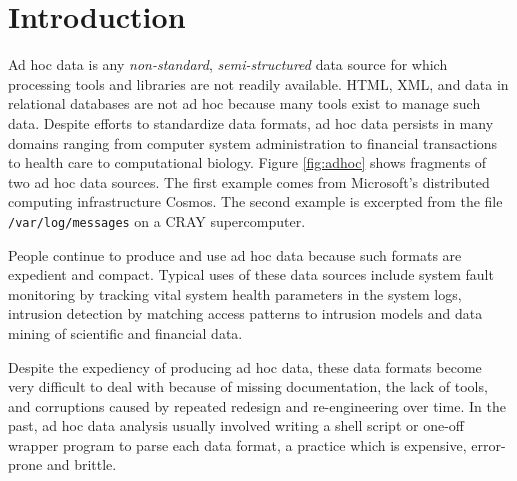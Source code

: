 \section{Introduction}



Ad hoc data is any {\em non-standard}, {\em semi-structured} 
data source for which processing tools and libraries are not
readily available. HTML, XML, and data in relational databases are not ad hoc because 
many tools exist to manage such data.
Despite efforts to standardize data formats, ad hoc data persists
in many domains ranging from computer system administration to 
financial transactions
 to health care to computational biology. Figure 
\ref{fig:adhoc} shows fragments of two ad hoc data sources.
The first example comes from Microsoft's distributed computing
infrastructure Cosmos. The second example is excerpted from the file 
\texttt{/var/log/messages}
on a CRAY supercomputer.

People continue to produce and use ad hoc data because such formats 
are expedient and compact.  
Typical uses of these data sources include system fault monitoring
by tracking vital system health parameters in the system logs,
intrusion detection by matching access patterns to intrusion
models and data mining of scientific and financial data.

Despite the expediency of producing ad hoc data, these
data formats become very difficult to deal with because of missing
documentation, the lack of tools, and corruptions caused by
repeated redesign and re-engineering over time. 
In the past, ad hoc data analysis usually involved
writing a shell script or one-off wrapper program to parse each 
data format, a practice which is expensive, error-prone and brittle.

